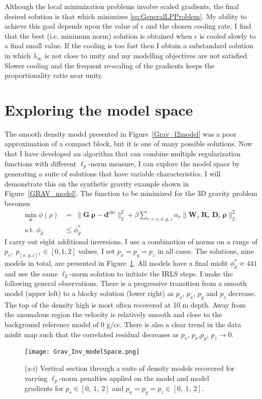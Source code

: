 Although the local minimization problems involve scaled gradients, the final desired solution is that which minimizes \eqref{eq:GeneralLPProblem}. My ability to achieve this goal depends upon the value of $\epsilon$ and the chosen cooling rate. I find that the best (i.e. minimum norm) solution is obtained when $\epsilon$ is cooled slowly to a final small value. If the cooling is too fast then I obtain a substandard solution in which $\lambda_\infty$ is not close to unity and my modelling objectives are not satisfied. Slower cooling and the frequent re-scaling of the gradients keeps the proportionality ratio near unity.

\section{Exploring the model space}

The smooth density model presented in Figure~\ref{Grav_l2model} was a poor approximation of a compact block, but it is one of many possible solutions.
Now that I have developed an algorithm that can combine multiple regularization functions with different $\ell_p$-norm measure, I can explore the model space by generating a suite of solutions that have variable characteristics.
I will demonstrate this on the synthetic gravity example shown in Figure~\ref{GRAV_model}. The function to be minimized for the 3D gravity problem becomes
\begin{equation}\label{ObjFun3D}
\begin{split}
\underset{\boldsymbol{\rho}}{\text{min}}\; \phi(\rho) & = \; \|\mathbf{G}\;\boldsymbol{\rho} - \mathbf{d}^{obs}\|_2^2 + \beta \sum_{r=s,x,y,z} \alpha_r \|\mathbf{W}_r \;\mathbf{R}_r\;\mathbf{D}_r \;\boldsymbol{\rho}\|_2^2 \\
\text{s.t.} \; \phi_d & \leq \phi_d^* \;
\end{split}
\end{equation}
I carry out eight additional inversions. I use a combination of norms on a range of $p_s,\; p_{[x,y,z]}, \in {[0,1,2]}$ values. I set $p_x=p_y=p_z$ in all cases. The solutions, nine models in total, are presented in Figure~\ref{GravMixedNorms}. All models have a final misfit $\phi_d^* \approx 441$ and use the same $\ell_2$-norm solution to initiate the IRLS steps.
I make the following general observations.
There is a progressive transition from a smooth model (upper left) to a blocky solution (lower right) as $p_s$, $p_{x}$, $p_y$ and $p_z$ decrease. The top of the density high is most often recovered at 10 m depth. Away from the anomalous region the velocity is relatively smooth and close to the background reference model of 0 g/cc. There is also a clear trend in the data misfit map such that the correlated residual decreases as $p_s$, $p_{x}$,$p_{y}$, $p_{z}\rightarrow 0$.
\begin{figure}
\texttt{[image: Grav\_Inv\_modelSpace.png]}
\caption{(a-i) Vertical section through a suite of density models recovered for varying $\ell_p$-norm penalties applied on the model and model gradients for $p_s\in[0,\:1,\: 2]$ and $p_{x}=p_{y}=p_{z}\in[0,\:1,\: 2]$.
}
\label{GravMixedNorms}
\end{figure}

